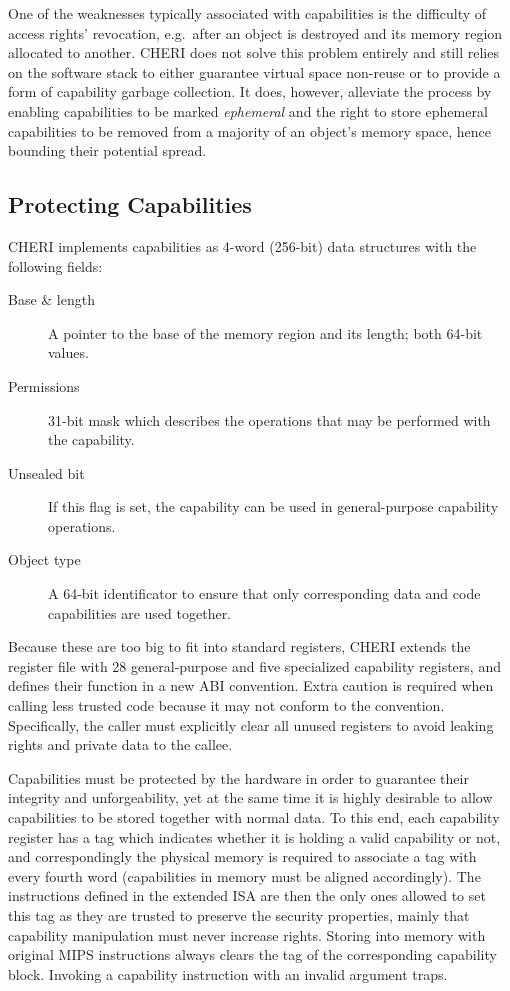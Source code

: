 \documentclass[a4paper,12pt,twoside,openright]{report}
\begin{document}
One of the weaknesses typically associated with capabilities is the difficulty of access rights' revocation, e.g.\ after an object is destroyed and its memory region allocated to another. CHERI does not solve this problem entirely and still relies on the software stack to either guarantee virtual space non-reuse or to provide a form of capability garbage collection. It does, however, alleviate the process by enabling capabilities to be marked \emph{ephemeral} and the right to store ephemeral capabilities to be removed from a majority of an object's memory space, hence bounding their potential spread.

\subsection{Protecting Capabilities}

CHERI implements capabilities as 4-word (256-bit) data structures with the following fields:
\begin{description}
	\item[Base \& length] A pointer to the base of the memory region and its length; both 64-bit values.
	\item[Permissions] 31-bit mask which describes the operations that may be performed with the capability.
	\item[Unsealed bit] If this flag is set, the capability can be used in general-purpose capability operations.
	\item[Object type] A 64-bit identificator to ensure that only corresponding data and code capabilities are used together.
\end{description}

Because these are too big to fit into standard registers, CHERI extends the register file with 28 general-purpose and five specialized capability registers, and defines their function in a new ABI convention. Extra caution is required when calling less trusted code because it may not conform to the convention. Specifically, the caller must explicitly clear all unused registers to avoid leaking rights and private data to the callee.

Capabilities must be protected by the hardware in order to guarantee their integrity and unforgeability, yet at the same time it is highly desirable to allow capabilities to be stored together with normal data. To this end, each capability register has a tag which indicates whether it is holding a valid capability or not, and correspondingly the physical memory is required to associate a tag with every fourth word (capabilities in memory must be aligned accordingly). The instructions defined in the extended ISA are then the only ones allowed to set this tag as they are trusted to preserve the security properties, mainly that capability manipulation must never increase rights. Storing into memory with original MIPS instructions always clears the tag of the corresponding capability block. Invoking a capability instruction with an invalid argument traps.
\end{document}
